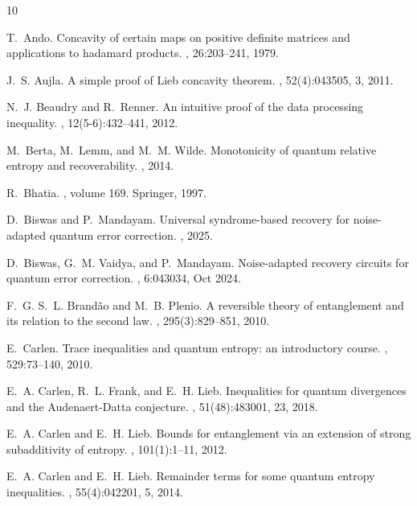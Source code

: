 \documentclass{article}
\numberwithin{equation}{section}
\begin{document}
\begin{thebibliography}{10}

T.~Ando.
\newblock Concavity of certain maps on positive definite matrices and
  applications to hadamard products.
, 26:203--241, 1979.

J.~S. Aujla.
\newblock A simple proof of {L}ieb concavity theorem.
, 52(4):043505, 3, 2011.

N.~J. Beaudry and R.~Renner.
\newblock An intuitive proof of the data processing inequality.
, 12(5-6):432--441, 2012.

M.~Berta, M.~Lemm, and M.~M. Wilde.
\newblock Monotonicity of quantum relative entropy and recoverability.
, 2014.

R.~Bhatia.
, volume 169.
\newblock Springer, 1997.

D.~Biswas and P.~Mandayam.
\newblock Universal syndrome-based recovery for noise-adapted quantum error
  correction.
, 2025.

D.~Biswas, G.~M. Vaidya, and P.~Mandayam.
\newblock Noise-adapted recovery circuits for quantum error correction.
, 6:043034, Oct 2024.

F.~G. S.~L. Brand\~ao and M.~B. Plenio.
\newblock A reversible theory of entanglement and its relation to the second
  law.
, 295(3):829--851, 2010.

E.~Carlen.
\newblock Trace inequalities and quantum entropy: an introductory course.
, 529:73--140, 2010.

E.~A. Carlen, R.~L. Frank, and E.~H. Lieb.
\newblock Inequalities for quantum divergences and the {A}udenaert-{D}atta
  conjecture.
, 51(48):483001, 23, 2018.

E.~A. Carlen and E.~H. Lieb.
\newblock Bounds for entanglement via an extension of strong subadditivity of
  entropy.
, 101(1):1--11, 2012.

E.~A. Carlen and E.~H. Lieb.
\newblock Remainder terms for some quantum entropy inequalities.
, 55(4):042201, 5, 2014.


\end{thebibliography}
\end{document}
